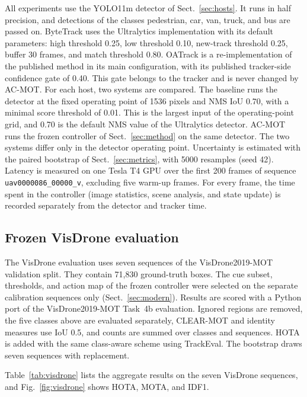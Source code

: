 \documentclass[pdflatex,sn-mathphys-num,iicol]{sn-jnl}
\begin{document}
All experiments use the YOLO11m detector of Sect.~\ref{sec:hosts}. It runs in
half precision, and detections of the classes pedestrian, car, van, truck, and
bus are passed on. ByteTrack uses the Ultralytics implementation with its
default parameters: high threshold 0.25, low threshold 0.10, new-track
threshold 0.25, buffer 30 frames, and match threshold 0.80. OATrack is a
re-implementation of the published method \cite{qi2026oatrack} in its main
configuration, with its published tracker-side confidence gate of 0.40. This
gate belongs to the tracker and is never changed by AC-MOT. For each host, two
systems are compared. The baseline runs the detector at the fixed operating
point of 1536 pixels and NMS IoU 0.70, with a minimal score threshold of 0.01.
This is the largest input of the operating-point grid, and 0.70 is the default
NMS value of the Ultralytics detector. AC-MOT runs the frozen controller of
Sect.~\ref{sec:method} on the same detector. The two systems differ only in
the detector operating point. Uncertainty is estimated with the paired
bootstrap of Sect.~\ref{sec:metrics}, with 5000 resamples (seed 42).
Latency is measured on one Tesla T4 GPU over the first 200 frames of sequence
\texttt{uav0000086\_00000\_v}, excluding five warm-up frames. For every
frame, the time spent in the controller (image statistics, scene analysis, and
state update) is recorded separately from the detector and tracker time.

\subsection{Frozen VisDrone evaluation}
The VisDrone evaluation uses seven sequences of the VisDrone2019-MOT
validation split. They contain 71,830 ground-truth boxes. The cue subset,
thresholds, and action map of the frozen controller were selected on the
separate calibration sequences only (Sect.~\ref{sec:modern}). Results are
scored with a Python port of the VisDrone2019-MOT Task~4b evaluation. Ignored
regions are removed, the five classes above are evaluated separately,
CLEAR-MOT and identity measures use IoU 0.5, and counts are summed over
classes and sequences. HOTA is added with the same class-aware scheme using
TrackEval. The bootstrap draws seven sequences with replacement.

Table~\ref{tab:visdrone} lists the aggregate results on the seven VisDrone
sequences, and Fig.~\ref{fig:visdrone} shows HOTA, MOTA, and IDF1.
\end{document}
